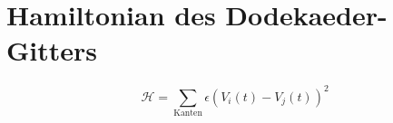 \section{Hamiltonian des Dodekaeder-Gitters}
\[ \mathcal{H} = \sum_{\text{Kanten}} \epsilon (V_i(t) - V_j(t))^2 \]